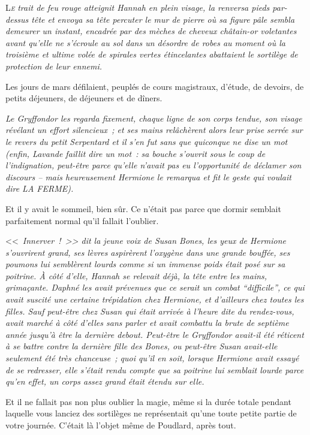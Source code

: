 
\lettrine{L}{\emph{e}} \emph{trait de feu rouge atteignit Hannah en plein visage, la renversa pieds par-dessus tête et envoya sa tête percuter le mur de pierre où sa figure pâle sembla demeurer un instant, encadrée par des mèches de cheveux châtain-or voletantes avant qu'elle ne s'écroule au sol dans un désordre de robes au moment où la troisième et ultime volée de spirales vertes étincelantes abattaient le sortilège de protection de leur ennemi.}

Les jours de mars défilaient, peuplés de cours magistraux, d'étude, de devoirs, de petits déjeuners, de déjeuners et de dîners.

\emph{Le Gryffondor les regarda fixement, chaque ligne de son corps tendue, son visage révélant un effort silencieux~; et ses mains relâchèrent alors leur prise serrée sur le revers du petit Serpentard et il s'en fut sans que quiconque ne dise un mot (enfin, Lavande faillit dire un mot~: sa bouche s'ouvrit sous le coup de l'indignation, peut-être parce qu'elle n'avait pas eu l'opportunité de déclamer son discours -- mais heureusement Hermione le remarqua et fit le geste qui voulait dire LA FERME).}

Et il y avait le sommeil, bien sûr. Ce n'était pas parce que dormir semblait parfaitement normal qu'il fallait l'oublier.

<<~\emph{Innerver~!~>> dit la jeune voix de Susan Bones, les yeux de Hermione s'ouvrirent grand, ses lèvres aspirèrent l'oxygène dans une grande bouffée, ses poumons lui semblèrent lourds comme si un immense poids était posé sur sa poitrine. À côté d'elle, Hannah se relevait déjà, la tête entre les mains, grimaçante. Daphné les avait prévenues que ce serait un combat “difficile”, ce qui avait suscité une certaine trépidation chez Hermione, et d'ailleurs chez toutes les filles. Sauf peut-être chez Susan qui était arrivée à l'heure dite du rendez-vous, avait marché à côté d'elles sans parler et avait combattu la brute de septième année jusqu'à être la dernière debout. Peut-être le Gryffondor avait-il été réticent à se battre contre la dernière fille des Bones, ou peut-être Susan avait-elle seulement été très chanceuse~; quoi qu'il en soit, lorsque Hermione avait essayé de se redresser, elle s'était rendu compte que sa poitrine lui semblait lourde parce qu'en effet, un corps assez grand était étendu sur elle.}

Et il ne fallait pas non plus oublier la magie, même si la durée totale pendant laquelle vous lanciez des sortilèges ne représentait qu'une toute petite partie de votre journée. C'était là l'objet même de Poudlard, après tout.


